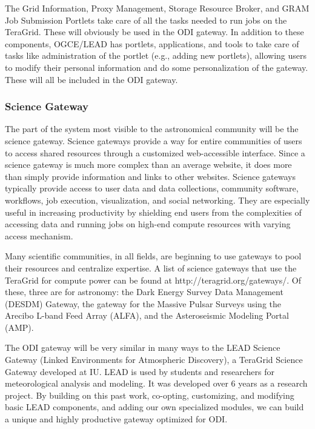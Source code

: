 \documentclass[10pt,conference]{IEEEtran}
\begin{document}
The Grid Information, Proxy Management, Storage Resource Broker, and GRAM Job Submission Portlets take care of all the tasks needed to run jobs on the TeraGrid. These will obviously be used in the ODI gateway. In addition to these components, OGCE/LEAD has portlets, applications, and tools to take care of tasks like administration of the portlet (e.g., adding new portlets), allowing users to modify their personal information and do some personalization of the gateway. These will all be included in the ODI gateway. 

\subsubsection{Science Gateway}

The part of the system most visible to the astronomical community will be the science gateway. Science gateways provide a way for entire communities of users to access shared resources through a customized web-accessible interface. Since a science gateway is much more complex than an average website, it does more than simply provide information and links to other websites. Science gateways typically provide access to user data and data collections, community software, workflows, job execution, visualization, and social networking. They are especially useful in increasing productivity by shielding end users from the complexities of accessing data and running jobs on high-end compute resources with varying access mechanism.

Many scientific communities, in all fields, are beginning to use gateways to pool their resources and centralize expertise.  A list of science gateways that use the TeraGrid for compute power can be found at http://teragrid.org/gateways/. Of these, three are for astronomy: the Dark Energy Survey Data Management (DESDM) Gateway, the gateway for the Massive Pulsar Surveys using the Arecibo L-band Feed Array (ALFA), and the Asteroseismic Modeling Portal (AMP).  

The ODI gateway will be very similar in many ways to the LEAD Science Gateway (Linked Environments for Atmospheric Discovery), a TeraGrid Science Gateway developed at IU. LEAD is used by students and researchers for meteorological analysis and modeling. It was developed over 6 years as a research project. By building on this past work, co-opting, customizing, and modifying basic LEAD components, and adding our own specialized modules, we can build a unique and highly productive gateway optimized for ODI.
\end{document}
